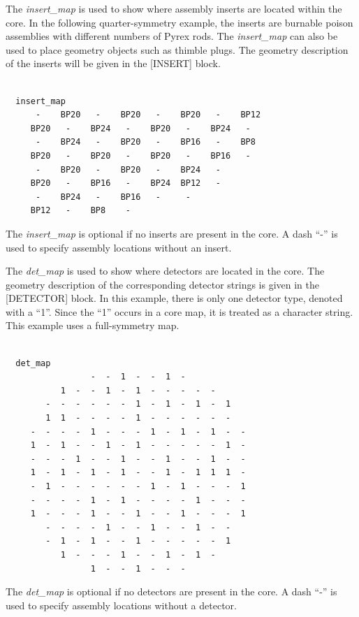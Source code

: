The {\it insert\_map} is used to show where assembly inserts are located within the core.
In the following quarter-symmetry example,
the inserts are burnable poison assemblies with different numbers of Pyrex rods.
The {\it insert\_map} can also be used to place geometry objects such as thimble plugs.
The geometry description of the inserts will be given in the [INSERT] block.
\begin{Verbatim}[fontsize=\small]

  insert_map
      -    BP20   -    BP20   -    BP20   -    BP12
     BP20   -    BP24   -    BP20   -    BP24   -
      -    BP24   -    BP20   -    BP16   -    BP8
     BP20   -    BP20   -    BP20   -    BP16   -
      -    BP20   -    BP20   -    BP24   -
     BP20   -    BP16   -    BP24  BP12   -
      -    BP24   -    BP16   -     -
     BP12   -    BP8    -

\end{Verbatim}
The {\it insert\_map} is optional if no inserts are present in the core.
A dash ``-'' is used to specify assembly locations without an insert.

The {\it det\_map} is used to show where detectors are located in the core. The geometry description
of the corresponding detector strings is given in the [DETECTOR] block. In this example,
there is only one detector type, denoted with a ``1''. Since the ``1'' occurs in a core map,
it is treated as a character string. This example uses a full-symmetry map.
\begin{Verbatim}[fontsize=\small]

  det_map
                 -  -  1  -  -  1  -
           1  -  -  1  -  1  -  -  -  -  -
        -  -  -  -  -  -  1  -  1  -  1  -  1
        1  1  -  -  -  -  1  -  -  -  -  -  -
     -  -  -  -  1  -  -  -  1  -  1  -  1  -  -
     1  -  1  -  -  1  -  1  -  -  -  -  -  1  -
     -  -  -  1  -  -  1  -  -  1  -  -  1  -  -
     1  -  1  -  1  -  1  -  -  1  -  1  1  1  -
     -  1  -  -  -  -  -  -  1  -  1  -  -  -  1
     -  -  -  -  1  -  1  -  -  -  -  1  -  -  -
     1  -  -  -  1  -  -  1  -  -  1  -  -  -  1
        -  -  -  -  1  -  -  1  -  -  1  -  -
        -  1  -  1  -  -  1  -  -  -  -  -  1
           1  -  -  -  1  -  -  1  -  1  -
                 1  -  -  1  -  -  -

\end{Verbatim}
The {\it det\_map} is optional if no detectors are present in the core.
A dash ``-'' is used to specify assembly locations without a detector.



